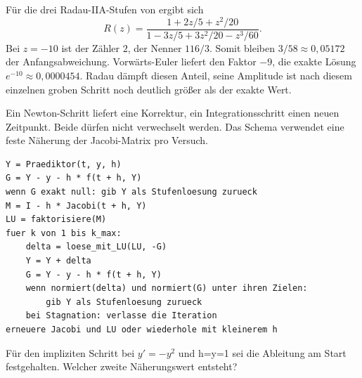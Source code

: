 Für die drei Radau-IIA-Stufen von  ergibt sich
\[
 R(z)=\frac{1+2z/5+z^2/20}{1-3z/5+3z^2/20-z^3/60}.
\]
Bei \(z=-10\) ist der Zähler \(2\), der Nenner \(116/3\). Somit bleiben \(3/58\approx0{,}05172\) der Anfangsabweichung. Vorwärts-Euler liefert den Faktor \(-9\), die exakte Lösung \(e^{-10}\approx0{,}0000454\). Radau dämpft diesen Anteil, seine Amplitude ist nach diesem einzelnen groben Schritt noch deutlich größer als der exakte Wert.

Ein Newton-Schritt liefert eine Korrektur, ein Integrationsschritt einen neuen Zeitpunkt. Beide dürfen nicht verwechselt werden. Das Schema verwendet eine feste Näherung der Jacobi-Matrix pro Versuch.
{\small\begin{verbatim}
Y = Praediktor(t, y, h)
G = Y - y - h * f(t + h, Y)
wenn G exakt null: gib Y als Stufenloesung zurueck
M = I - h * Jacobi(t + h, Y)
LU = faktorisiere(M)
fuer k von 1 bis k_max:
    delta = loese_mit_LU(LU, -G)
    Y = Y + delta
    G = Y - y - h * f(t + h, Y)
    wenn normiert(delta) und normiert(G) unter ihren Zielen:
        gib Y als Stufenloesung zurueck
    bei Stagnation: verlasse die Iteration
erneuere Jacobi und LU oder wiederhole mit kleinerem h
\end{verbatim}}
Für den impliziten Schritt bei \(y'=-y^2\) und h=y=1 sei die Ableitung am Start festgehalten. Welcher zweite Näherungswert entsteht?
